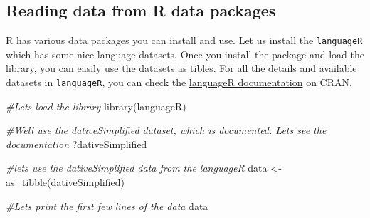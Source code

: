 \documentclass[
]{book}
\newenvironment{Shaded}{\begin{snugshade}}{\end{snugshade}}
\newcommand{\CommentTok}[1]{\textcolor[rgb]{0.56,0.35,0.01}{\textit{#1}}}
\newcommand{\FunctionTok}[1]{\textcolor[rgb]{0.00,0.00,0.00}{#1}}
\newcommand{\NormalTok}[1]{#1}
\newcommand{\OtherTok}[1]{\textcolor[rgb]{0.56,0.35,0.01}{#1}}
\begin{document}
\hypertarget{reading-data-from-r-data-packages}{%
\subsection{Reading data from R data packages}\label{reading-data-from-r-data-packages}}

R has various data packages you can install and use. Let us install the \texttt{languageR} which has some nice language datasets. Once you install the package and load the library, you can easily use the datasets as tibles. For all the details and available datasets in \texttt{languageR}, you can check the \href{https://cran.r-project.org/web/packages/languageR/languageR.pdf}{languageR documentation} on CRAN.

\begin{Shaded}
\begin{Highlighting}[]
\CommentTok{\#Let\textquotesingle{}s load the library}
\FunctionTok{library}\NormalTok{(languageR)}

\CommentTok{\#We\textquotesingle{}ll use the dativeSimplified dataset, which is documented. Let\textquotesingle{}s see the documentation}
\NormalTok{?dativeSimplified}
\end{Highlighting}
\end{Shaded}

\begin{Shaded}
\begin{Highlighting}[]
\CommentTok{\#let\textquotesingle{}s use the dativeSimplified data from the languageR }
\NormalTok{data }\OtherTok{\textless{}{-}} \FunctionTok{as\_tibble}\NormalTok{(dativeSimplified)}

\CommentTok{\#Let\textquotesingle{}s print the first few lines of the data}
\NormalTok{data}
\end{Highlighting}
\end{Shaded}
\end{document}
